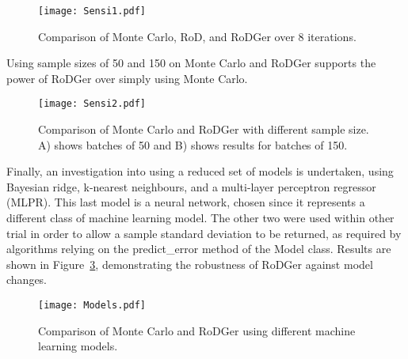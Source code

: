 \begin{figure}[H]
    \begin{center}
        \texttt{[image: Sensi1.pdf]}
        \caption[Results of Prolonged Sampling]{Comparison of Monte Carlo, RoD, and RoDGer over 8 iterations.}
        \label{fig:sensi1}
    \end{center}
\end{figure}

Using sample sizes of 50 and 150 on Monte Carlo and RoDGer supports the power of RoDGer over simply using Monte Carlo.

\begin{figure}[H]
    \begin{center}
        \texttt{[image: Sensi2.pdf]}
        \caption[Results of Different Sample Sizes]{Comparison of Monte Carlo and RoDGer with different sample size. A) shows batches of 50 and B) shows results for batches of 150.}
        \label{fig:sensi2}
    \end{center}
\end{figure}

Finally, an investigation into using a reduced set of models is undertaken, using Bayesian ridge, k-nearest neighbours, and a multi-layer perceptron regressor (MLPR). This last model is a neural network, chosen since it represents a different class of machine learning model. The other two were used within other trial in order to allow a sample standard deviation to be returned, as required by algorithms relying on the predict\_error method of the Model class. Results are shown in Figure~\ref{fig:modelSensi}, demonstrating the robustness of RoDGer against model changes.

\begin{figure}[H]
    \begin{center}
        \texttt{[image: Models.pdf]}
        \caption[Sensitivity to Model Selection]{Comparison of Monte Carlo and RoDGer using different machine learning models.}
        \label{fig:modelSensi}
    \end{center}
\end{figure}


